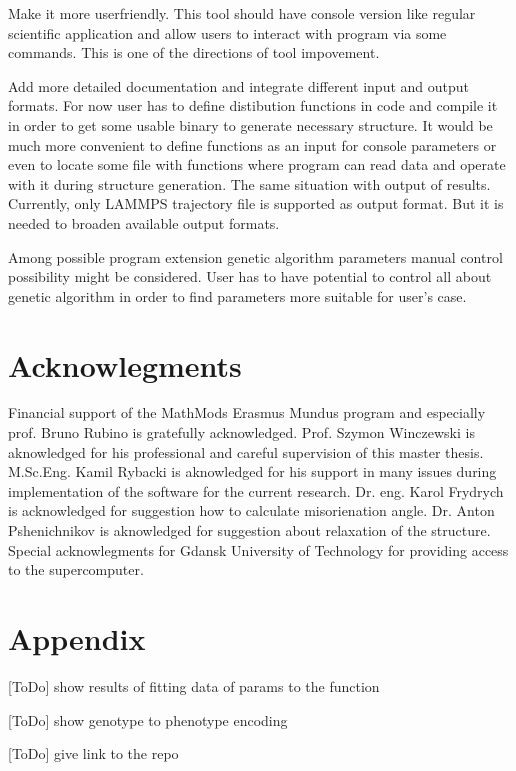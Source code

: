 \documentclass[12pt]{report}
\begin{document}
Make it more userfriendly. This tool should have console version like regular scientific application and allow users to interact with program via some commands. This is one of the directions of tool impovement.

Add more detailed documentation and integrate different input and output formats. For now user has to define distibution functions in code and compile it in order to get some usable binary to generate necessary structure. It would be much more convenient to define functions as an input for console parameters or even to locate some file with functions where program can read data and operate with it during structure generation. The same situation with output of results. Currently, only LAMMPS trajectory file is supported as output format. But it is needed to broaden available output formats.

Among possible program extension genetic algorithm parameters manual control possibility might be considered. User has to have potential to control all about genetic algorithm in order to find parameters more suitable for user's case.

\section{Acknowlegments}

Financial support of the MathMods Erasmus Mundus program and especially prof. Bruno Rubino is gratefully acknowledged. Prof. Szymon Winczewski is aknowledged for his professional and careful supervision of this master thesis. M.Sc.Eng. Kamil Rybacki is aknowledged for his support in many issues during implementation of the software for the current research. Dr. eng. Karol Frydrych is acknowledged for suggestion how to calculate misorienation angle. Dr. Anton Pshenichnikov is aknowledged for suggestion about relaxation of the structure. Special acknowlegments for Gdansk University of Technology for providing access to the supercomputer.

\goodbreak
\section{Appendix}

[ToDo] show results of fitting data of params to the function

[ToDo] show genotype to phenotype encoding

[ToDo] give link to the repo
\end{document}
